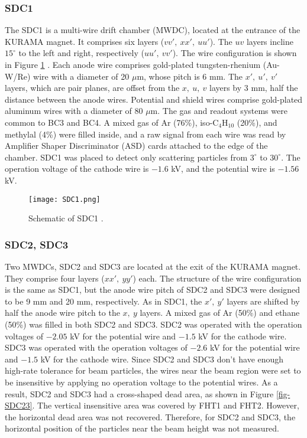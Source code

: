 %
\subsubsection{SDC1}
The SDC1 is a multi-wire drift chamber (MWDC), located at the entrance of the KURAMA magnet. It comprises six layers ($vv',\ xx',\ uu'$). The $uv$ layers incline $15^{\circ}$ to the left and right, respectively ($uu',\ vv'$). The wire configuration is shown in Figure \ref{fig-SDC1} \cite{Nana-D}. Each anode wire comprises gold-plated tungsten-rhenium (Au-W/Re) wire with a diameter of 20 $\mu$m, whose pitch is 6 mm. The $x',\ u',\ v'$ layers, which are pair planes, are offset from the $x,\ u,\ v$ layers by 3 mm, half the distance between the anode wires. Potential and shield wires comprise gold-plated aluminum wires with a diameter of 80 $\mu$m. 
The gas and readout systems were common to BC3 and BC4. A mixed gas of Ar (76\%), iso-C$_4$H$_{10}$ (20\%), and methylal (4\%) were filled inside, and a raw signal from each wire was read by Amplifier Shaper Discriminator (ASD) cards attached to the edge of the chamber. SDC1 was placed to detect only scattering particles from $3^{\circ}$ to $30^{\circ}$.
The operation voltage of the cathode wire is $-1.6$ kV, and the potential wire is $-1.56$ kV.

\begin{figure}[!h]
 \begin{center}
   \texttt{[image: SDC1.png]}
   \caption{Schematic of SDC1 \cite{Nana-D}.}
   \label{fig-SDC1}
 \end{center}
\end{figure}

%
\subsubsection{SDC2, SDC3}
\label{sec: SDC23}
Two MWDCs, SDC2 and SDC3 are located at the exit of the KURAMA magnet. They comprise four layers ($xx',\ yy'$) each. The structure of the wire configuration is the same as SDC1, but the anode wire pitch of SDC2 and SDC3 were designed to be 9 mm and 20 mm, respectively. As in SDC1, the $x',\ y'$ layers are shifted by half the anode wire pitch to the $x,\ y$ layers. A mixed gas of Ar (50\%) and ethane (50\%) was filled in both SDC2 and SDC3. SDC2 was operated with the operation voltages of $-2.05$ kV for the potential wire and $-1.5$ kV for the cathode wire. SDC3 was operated with the operation voltages of $-2.6$ kV for the potential wire and $-1.5$ kV for the cathode wire. Since SDC2 and SDC3 don't have enough high-rate tolerance for beam particles, the wires near the beam region were set to be insensitive by applying no operation voltage to the potential wires. As a result, SDC2 and SDC3 had a cross-shaped dead area, as shown in Figure \ref{fig-SDC23}. The vertical insensitive area was covered by FHT1 and FHT2. However, the horizontal dead area was not recovered. Therefore, for SDC2 and SDC3, the horizontal position of the particles near the beam height was not measured. %

